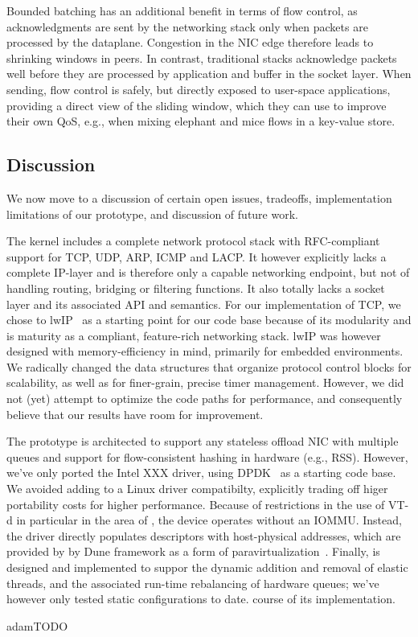  Bounded batching has an additional benefit
in terms of flow control, as acknowledgments are sent by the
networking stack only when packets are processed by the dataplane.
Congestion in the NIC edge therefore leads to shrinking windows in
peers.  In contrast, traditional stacks acknowledge packets well
before they are processed by application and buffer in the socket
layer.  When sending, flow control is safely, but directly exposed to
user-space applications, providing a direct view of the sliding
window, which they can use to improve their own QoS, e.g., when mixing
elephant and mice flows in a key-value store.


\subsection{Discussion}
\label{sec:impl:discussion}

We now move to a discussion of certain open issues, tradeoffs,
implementation limitations of our prototype, and discussion of future
work.

The \ix kernel includes a complete network protocol stack with
RFC-compliant support for TCP, UDP, ARP, ICMP and LACP.  It however
explicitly lacks a complete IP-layer and is therefore only a capable
networking endpoint, but not of handling routing, bridging or
filtering functions.  It also totally lacks a socket layer and its
associated API and semantics.  For our implementation of TCP, we chose
to lwIP~\cite{dunkels2001design} as a starting point for our code base because of its
modularity and is maturity as a compliant, feature-rich networking
stack.  lwIP was however designed with memory-efficiency in mind,
primarily for embedded environments.  We radically changed the data
structures that organize protocol control blocks for scalability, as
well as for finer-grain, precise timer management.  However, we did
not (yet) attempt to optimize the code paths for performance, and
consequently believe that our results have room for improvement.

The \ix prototype is architected to support any stateless offload NIC
with multiple queues and support for flow-consistent hashing in
hardware (e.g., RSS).  However, we've only ported the Intel XXX
driver, using DPDK~\cite{intel:dpdk} as a starting code base.  We
avoided adding to \ix a Linux driver compatibilty, explicitly trading
off higer portability costs for higher performance.  Because of
restrictions in the use of VT-d in particular in the area of
, the device operates without an IOMMU.  Instead, the
driver directly populates descriptors with host-physical addresses,
which are provided by by Dune framework as a form of
paravirtualization~\cite{DBLP:conf/sosp/BarhamDFHHHN03}.  Finally, \ix
is designed and implemented to suppor the dynamic addition and removal
of elastic threads, and the associated run-time rebalancing of
hardware queues; we've however only tested static configurations to
date.
course of its implementation.


adam{TODO}


